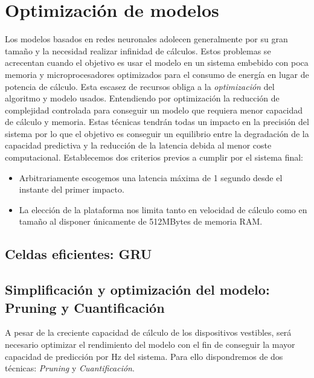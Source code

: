 \section{Optimización de modelos}\label{sec:req:optimizacion}

Los modelos basados en redes neuronales adolecen generalmente por su gran tamaño y la necesidad realizar infinidad de cálculos. Estos problemas se acrecentan cuando el objetivo es usar el modelo en un sistema embebido con poca memoria y microprocesadores optimizados para el consumo de energía en lugar de potencia de cálculo. Esta escasez de recursos obliga a la \textit{optimización} del algoritmo y modelo usados. Entendiendo por optimización la reducción de complejidad controlada para conseguir un modelo que requiera menor capacidad de cálculo y memoria. Estas técnicas tendrán todas un impacto en la precisión del sistema por lo que el objetivo es conseguir un equilibrio entre la degradación de la capacidad predictiva y la reducción de la latencia debida al menor coste computacional. Establecemos dos criterios previos a cumplir por el sistema final:

\begin{itemize}
  \item Arbitrariamente escogemos una latencia máxima de 1 segundo desde el instante del primer impacto.
  \item La elección de la plataforma nos limita tanto en velocidad de cálculo como en tamaño al disponer únicamente de 512MBytes de memoria RAM.
\end{itemize}

\subsection{Celdas eficientes: GRU}
  

\subsection{Simplificación y optimización del modelo: Pruning y Cuantificación}

  A pesar de la creciente capacidad de cálculo de los dispositivos vestibles, será necesario optimizar el rendimiento del modelo con el fin de conseguir la mayor capacidad de predicción por Hz del sistema. Para ello dispondremos de dos técnicas: \textit{Pruning} y \textit{Cuantificación}.

